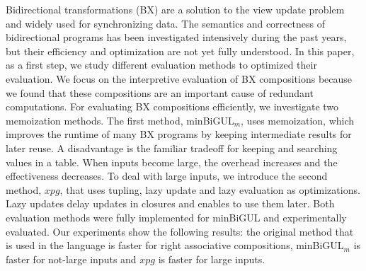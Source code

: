  Bidirectional transformations (BX) are a solution to the view update problem and widely used for synchronizing data. The semantics and correctness of bidirectional programs has been investigated intensively during the past years, but their efficiency and optimization are not yet fully understood. In this paper, as a first step, we study different evaluation methods to optimized their evaluation. We focus on the interpretive evaluation of BX compositions because we found that these compositions are an important cause of redundant computations. 
 For evaluating BX compositions efficiently, we investigate two memoization methods. The first method, minBiGUL$_m$, uses memoization, which improves the runtime of many BX programs by keeping intermediate results for later reuse. A disadvantage is the familiar tradeoff for keeping and searching values in a table.
  When inputs become large, the overhead increases and the effectiveness decreases. To deal with large inputs, we introduce the second method, $xpg$, that uses tupling, lazy update and lazy evaluation as optimizations. Lazy updates delay updates in closures and enables to use them later.
 Both evaluation methods were fully implemented for minBiGUL and experimentally evaluated. Our experiments show the following results: the original method that is used in the language is faster for right associative compositions, minBiGUL$_m$ is faster for not-large inputs and $xpg$ is faster for large inputs.
